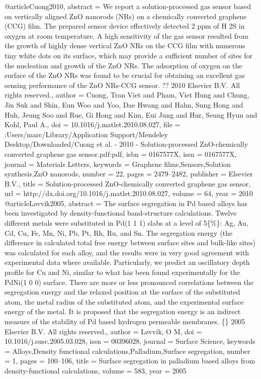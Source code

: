 @article{Cuong2010,
abstract = {We report a solution-processed gas sensor based on vertically aligned ZnO nanorods (NRs) on a chemically converted graphene (CCG) film. The prepared sensor device effectively detected 2 ppm of H
                        2S in oxygen at room temperature. A high sensitivity of the gas sensor resulted from the growth of highly dense vertical ZnO NRs on the CCG film with numerous tiny white dots on its surface, which may provide a sufficient number of sites for the nucleation and growth of the ZnO NRs. The adsorption of oxygen on the surface of the ZnO NRs was found to be crucial for obtaining an excellent gas sensing performance of the ZnO NRs-CCG sensor. ?? 2010 Elsevier B.V. All rights reserved.},
author = {Cuong, Tran Viet and Pham, Viet Hung and Chung, Jin Suk and Shin, Eun Woo and Yoo, Dae Hwang and Hahn, Sung Hong and Huh, Jeung Soo and Rue, Gi Hong and Kim, Eui Jung and Hur, Seung Hyun and Kohl, Paul A.},
doi = {10.1016/j.matlet.2010.08.027},
file = {:Users/marc/Library/Application Support/Mendeley Desktop/Downloaded/Cuong et al. - 2010 - Solution-processed ZnO-chemically converted graphene gas sensor.pdf:pdf},
isbn = {0167577X},
issn = {0167577X},
journal = {Materials Letters},
keywords = {Graphene films,Sensors,Solution synthesis,ZnO nanorods},
number = {22},
pages = {2479--2482},
publisher = {Elsevier B.V.},
title = {{Solution-processed ZnO-chemically converted graphene gas sensor}},
url = {http://dx.doi.org/10.1016/j.matlet.2010.08.027},
volume = {64},
year = {2010}
}
@article{Løvvik2005,
abstract = {The surface segregation in Pd based alloys has been investigated by density-functional band-structure calculations. Twelve different metals were substituted in Pd(1 1 1) slabs at a level of 5{\{}{\%}{\}}: Ag, Au, Cd, Cu, Fe, Mn, Ni, Pb, Pt, Rh, Ru, and Sn. The segregation energy (the difference in calculated total free energy between surface sites and bulk-like sites) was calculated for each alloy, and the results were in very good agreement with experimental data where available. Particularly, we predict an oscillatory depth profile for Cu and Ni, similar to what has been found experimentally for the PdNi(1 0 0) surface. There are more or less pronounced correlations between the segregation energy and the relaxed position at the surface of the substituted atom, the metal radius of the substituted atom, and the experimental surface energy of the metal. It is proposed that the segregation energy is an indirect measure of the stability of Pd based hydrogen permeable membranes. {\{}{\textcopyright}{\}} 2005 Elsevier B.V. All rights reserved.},
author = {L{\o}vvik, O M},
doi = {10.1016/j.susc.2005.03.028},
issn = {00396028},
journal = {Surface Science},
keywords = {Alloys,Density functional calculations,Palladium,Surface segregation},
number = {1},
pages = {100--106},
title = {{Surface segregation in palladium based alloys from density-functional calculations}},
volume = {583},
year = {2005}
}

